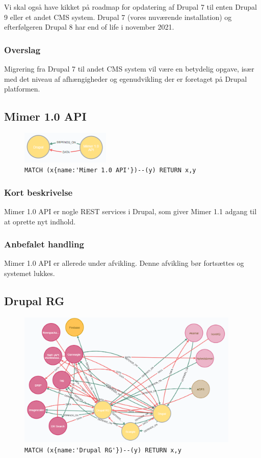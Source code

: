 \documentclass{article}
\begin{document}
Vi skal også have kikket på roadmap for opdatering af Drupal 7 til enten Drupal 9 eller et andet CMS system. Drupal 7 (vores nuværende installation) og efterfølgeren Drupal 8 har end of life i november 2021.
\subsubsection*{Overslag}
Migrering fra Drupal 7 til andet CMS system vil være en betydelig opgave, især med det niveau af afhængigheder og egenudvikling der er foretaget på Drupal platformen. 


\subsection{Mimer 1.0 API}
\begin{figure}[H]
\includegraphics[width=120pt]{MimerAPI.PNG}
\cprotect\caption{\verb|MATCH (x{name:'Mimer 1.0 API'})--(y) RETURN x,y|}
\end{figure}
\subsubsection*{Kort beskrivelse}
Mimer 1.0 API er nogle REST services i Drupal, som giver Mimer 1.1 adgang til at oprette nyt indhold.
\subsubsection*{Anbefalet handling}
Mimer 1.0 API er allerede under afvikling. Denne afvikling bør fortsættes og systemet lukkes.


\subsection{Drupal RG}
\begin{figure}[H]
\includegraphics[width=300pt]{DrupalRG.PNG}
\cprotect\caption{\verb|MATCH (x{name:'Drupal RG'})--(y) RETURN x,y|}
\end{figure}
\end{document}
